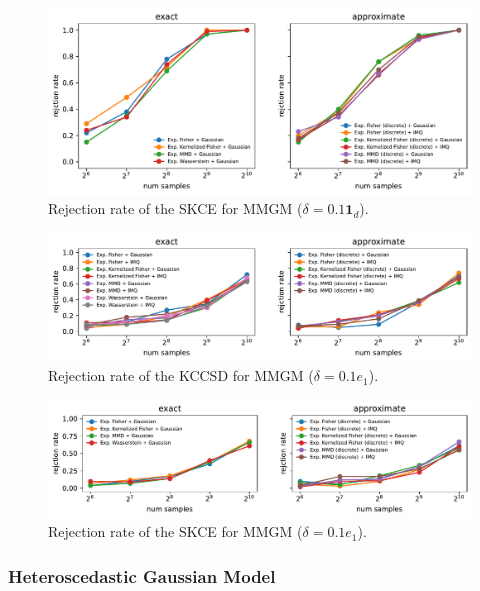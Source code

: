 \documentclass{uai2023} %
\begin{document}
\begin{figure}[!htb]
    \centering
    \includegraphics[width=\linewidth]{paper/figures/pmgm_skce_delta=0.1_shift-dim=-1.pdf}
    \caption{Rejection rate of the SKCE for MMGM ($\delta = 0.1 \mathbf{1}_d$).}
    \label{fig:pmgm_skce_all}
\end{figure}

\begin{figure}[!htb]
    \centering
    \includegraphics[width=\linewidth]{paper/figures/pmgm_kccsd_delta=0.1_shift-dim=1.pdf}
    \caption{Rejection rate of the KCCSD for MMGM ($\delta = 0.1 e_1$).}
\end{figure}

\begin{figure}[!htb]
    \centering
    \includegraphics[width=\linewidth]{paper/figures/pmgm_skce_delta=0.1_shift-dim=1.pdf}
    \caption{Rejection rate of the SKCE for MMGM ($\delta = 0.1 e_1$).}
    \label{fig:pmgm_skce_first}
\end{figure}

\subsubsection{Heteroscedastic Gaussian Model}
\end{document}
